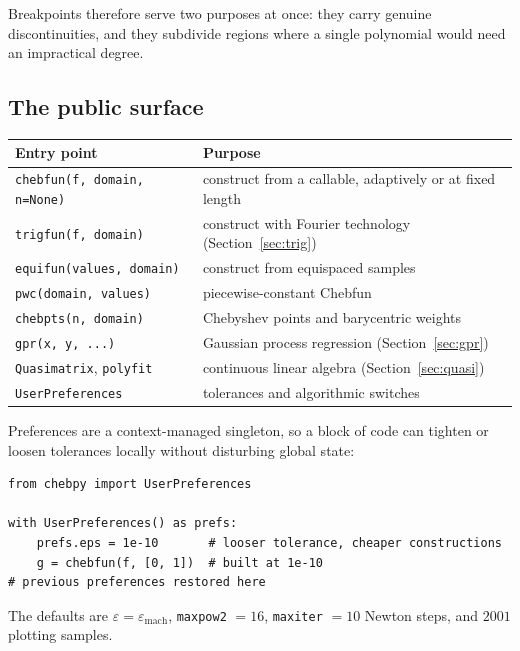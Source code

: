 \documentclass[11pt,a4paper]{article}
\newcommand{\eps}{\varepsilon_{\mathrm{mach}}}
\newcommand{\code}[1]{\texttt{#1}}
\begin{document}
Breakpoints therefore serve two purposes at once: they carry genuine
discontinuities, and they subdivide regions where a single polynomial would
need an impractical degree.

\subsection{The public surface}

\begin{center}
\begin{tabular}{@{}ll@{}}
\toprule
\textbf{Entry point} & \textbf{Purpose} \\
\midrule
\code{chebfun(f, domain, n=None)} & construct from a callable, adaptively or at
                                    fixed length \\
\code{trigfun(f, domain)}         & construct with Fourier technology
                                    (Section~\ref{sec:trig}) \\
\code{equifun(values, domain)}    & construct from equispaced samples \\
\code{pwc(domain, values)}        & piecewise-constant Chebfun \\
\code{chebpts(n, domain)}         & Chebyshev points and barycentric weights \\
\code{gpr(x, y, ...)}             & Gaussian process regression
                                    (Section~\ref{sec:gpr}) \\
\code{Quasimatrix}, \code{polyfit}& continuous linear algebra
                                    (Section~\ref{sec:quasi}) \\
\code{UserPreferences}            & tolerances and algorithmic switches \\
\bottomrule
\end{tabular}
\end{center}

\noindent
Preferences are a context-managed singleton, so a block of code can tighten or
loosen tolerances locally without disturbing global state:

\begin{lstlisting}
from chebpy import UserPreferences

with UserPreferences() as prefs:
    prefs.eps = 1e-10       # looser tolerance, cheaper constructions
    g = chebfun(f, [0, 1])  # built at 1e-10
# previous preferences restored here
\end{lstlisting}

\noindent
The defaults are $\varepsilon = \eps$, \code{maxpow2} $= 16$,
\code{maxiter} $= 10$ Newton steps, and $2001$ plotting samples.
\end{document}
